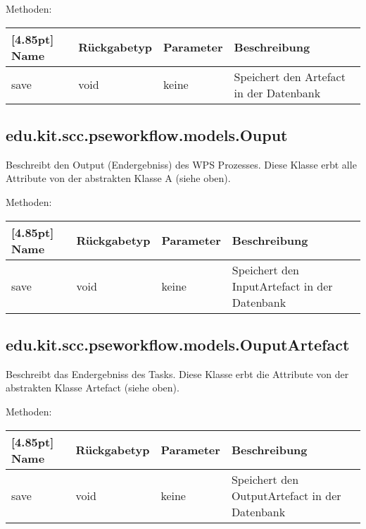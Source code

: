 			Methoden:
			\begin{center}
				\setlength\tabcolsep{5pt}
				\renewcommand{\arraystretch}{1.5}
				
				\begin{tabularx}{\textwidth}{|l|l|l|X|}
					\hline
					\rowcolor[gray]{0.75}[4.85pt]
					Name & Rückgabetyp & Parameter & Beschreibung \\ \hline 
					save & void & keine & Speichert den Artefact in der Datenbank \\
					\hline
				\end{tabularx}
			\end{center}
        \subsection{edu.kit.scc.pseworkflow.models.Ouput}
			Beschreibt den Output (Endergebniss) des WPS Prozesses. \newline
			Diese Klasse erbt alle Attribute von der abstrakten Klasse A (siehe oben).
			
			Methoden:
			\begin{center}
				\setlength\tabcolsep{5pt}
				\renewcommand{\arraystretch}{1.5}
				
				\begin{tabularx}{\textwidth}{|l|l|l|X|}
					\hline
					\rowcolor[gray]{0.75}[4.85pt]
					Name & Rückgabetyp & Parameter & Beschreibung \\ \hline 
				    save & void & keine & Speichert den InputArtefact in der Datenbank \\
					\hline
				\end{tabularx}
			\end{center}
        \subsection{edu.kit.scc.pseworkflow.models.OuputArtefact}
			Beschreibt das Endergebniss des Tasks. \newline
			Diese Klasse erbt die Attribute von der abstrakten Klasse Artefact (siehe oben).
			
			Methoden:
			\begin{center}
				\setlength\tabcolsep{5pt}
				\renewcommand{\arraystretch}{1.5}
				
				\begin{tabularx}{\textwidth}{|l|l|l|X|}
					\hline
					\rowcolor[gray]{0.75}[4.85pt]
					Name & Rückgabetyp & Parameter & Beschreibung \\ \hline 
				    save & void & keine & Speichert den OutputArtefact in der Datenbank \\
					\hline
				\end{tabularx}
			\end{center}

















